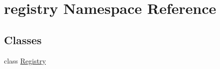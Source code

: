 \hypertarget{namespaceregistry}{}\section{registry Namespace Reference}
\label{namespaceregistry}
\subsection*{Classes}
\begin{DoxyCompactItemize}
\item 
class \hyperlink{classregistry_1_1Registry}{Registry}
\end{DoxyCompactItemize}
